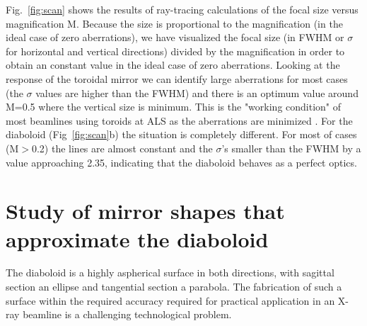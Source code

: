 \documentclass{iucr}              %
\begin{document}
Fig.~\ref{fig:scan} shows the results of ray-tracing calculations of the focal size versus magnification M. Because the size is proportional to the magnification (in the ideal case of zero aberrations), we have visualized the focal size (in FWHM or $\sigma$ for horizontal and vertical directions) divided by the magnification in order to obtain an constant value in the ideal case of zero aberrations. Looking at the response of the toroidal mirror we can identify large aberrations for most cases (the $\sigma$ values are higher than the FWHM) and there is an optimum value around M=0.5 where the vertical size is minimum. This is the "working condition" of most beamlines using toroids at ALS as the aberrations are minimized \cite{MacDowell2004}. For the diaboloid (Fig~\ref{fig:scan}b) the situation is completely different. For most of cases (M$>$0.2) the lines are almost constant and the $\sigma$'s smaller than the FWHM by a value approaching 2.35, indicating that the diaboloid behaves as a perfect optics. 




\section{Study of mirror shapes that approximate the diaboloid}
\label{sec:approximatedShapes}

The diaboloid is a highly aspherical surface in both directions, with sagittal section an ellipse and tangential section a parabola. The fabrication of such a surface within the required accuracy required for practical application in an X-ray beamline is a challenging technological problem. 




\end{document}
